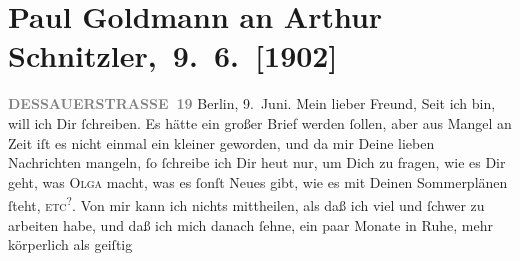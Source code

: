 

         
         \renewcommand{\erwaehntePersonen}{Personen: Paul Goldmann, Olga Schnitzler}
         \renewcommand{\erwaehnteOrte}{Orte: Berlin, Dessauer Straße, Wien}
         \renewcommand{\erwaehnteWerke}{}
               \section[ Paul Goldmann an Arthur Schnitzler, 9. 6. {[}1902{]}]{ Paul Goldmann an Arthur Schnitzler, 9. 6. {[}1902{]}}\nopagebreak{}\rehead{ }\begin{ledgroupsized}[t]{13cm}\normalsize\beginnumbering \toendnotes[C]{\smallbreak\pagebreak[2]} 
\toendnotes[C]{\smallbreak}\pstart
           \noindent{}\raggedleft{}{\pb}\textcolor{gray}{\textbf{DESSAUERSTRASSE 19}}\pend
           \pstart
           Berlin, 9. Juni.\pend
           \pstart\center{}Mein lieber Freund,\pend\pstart
           Seit ich \label{K_L03210-1v}\label{K_L03210-1h} bin, will ich Dir ſchreiben.
               Es hätte ein großer Brief werden ſollen, aber aus Mangel an Zeit iſt es nicht einmal
               ein kleiner geworden, und da mir Deine lieben Nachrichten mangeln, ſo ſchreibe ich
               Dir heut nur, um Dich zu fragen, wie es Dir geht, was
                  \textsc{Olga} macht, was {\pb}es ſonſt Neues gibt, wie es mit
               Deinen Sommerplänen ſteht, \textsc{etc}\substVorne{}\textsuperscript{?}\substDazwischen{}.\substHinten{}\pend
           \pstart
           Von mir kann ich nichts mittheilen, als daß ich viel und ſchwer zu arbeiten habe, und
               daß ich mich danach ſehne, ein paar Monate in Ruhe, mehr körperlich als geiſtig

\end{ledgroupsized}
